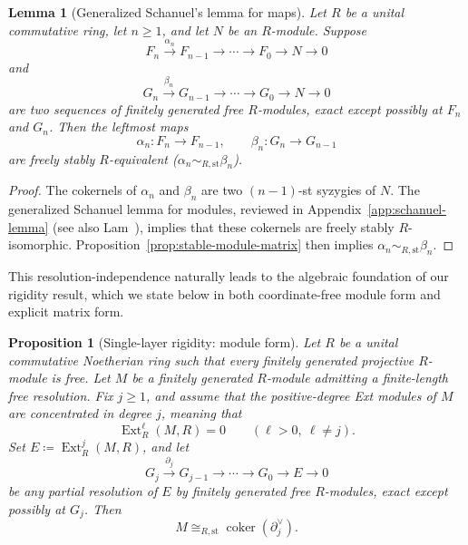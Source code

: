 \documentclass[aps,prx,english,superscriptaddress,twocolumn,tightenlines,showpacs,longbibliography,floatfix,amsfonts]{revtex4-2}
\newtheorem{proposition}{Proposition}
\newtheorem{lemma}{Lemma}
\theoremstyle{remark}
\theoremstyle{definition}
\begin{document}
\begin{lemma}[Generalized Schanuel's lemma for maps]
    \label{lem:generalized-schanuel}
    Let $R$ be a unital commutative ring, let $n \ge 1$, and let $N$ be an $R$-module. Suppose
    \begin{equation}
        F_n \xrightarrow{\alpha_n} F_{n-1} \to \cdots \to F_0 \to N \to 0
    \end{equation}
    and
    \begin{equation}
        G_n \xrightarrow{\beta_n} G_{n-1} \to \cdots \to G_0 \to N \to 0
    \end{equation}
    are two sequences of finitely generated free $R$-modules, exact except possibly at $F_n$ and $G_n$.
    Then the leftmost maps
	\begin{equation}
		\alpha_n \colon F_n \to F_{n-1},
		\qquad
		\beta_n \colon G_n \to G_{n-1}
	\end{equation}
	are freely stably \(R\)-equivalent ($\alpha_n \sim_{R,\mathrm{st}} \beta_n$).
\end{lemma}

\begin{proof}
	The cokernels of $\alpha_n$ and $\beta_n$ are two $(n-1)$-st syzygies of $N$. The generalized Schanuel lemma for modules, reviewed in Appendix~\ref{app:schanuel-lemma} (see also Lam~\cite[\S~5A, Cor.~5.5]{Lam1999}), implies that these cokernels are freely stably \(R\)-isomorphic. Proposition~\ref{prop:stable-module-matrix} then implies $\alpha_n \sim_{R,\mathrm{st}} \beta_n$.
\end{proof}

This resolution-independence naturally leads to the algebraic foundation of our rigidity result, which we state below in both coordinate-free module form and explicit matrix form.

\begin{proposition}[Single-layer rigidity: module form]
	\label{prop:isolated-ext-module}
	\label{thm:isolated-ext-module}
	\label{thm:stable-determination-isolated-ext}
	Let $R$ be a unital commutative Noetherian ring such that every finitely generated projective $R$-module is free. Let $M$ be a finitely generated $R$-module admitting a finite-length free resolution. Fix $j \ge 1$, and assume that the positive-degree Ext modules of $M$ are concentrated in degree $j$, meaning that
	\begin{equation}
		\operatorname{Ext}_R^\ell(M,R)=0
		\qquad (\ell>0,\ \ell\neq j).
	\end{equation}
	Set $E\coloneqq \operatorname{Ext}_R^j(M,R)$, and let
	\begin{equation}
		G_j\xrightarrow{\partial_j}G_{j-1}
		\longrightarrow\cdots\longrightarrow
		G_0\longrightarrow E\longrightarrow 0
	\end{equation}
	be any partial resolution of $E$ by finitely generated free
	$R$-modules, exact except possibly at $G_j$. Then
	\begin{equation}
		M\cong_{R,\mathrm{st}}\operatorname{coker}(\partial_j^\vee).
	\end{equation}
\end{proposition}
\end{document}
